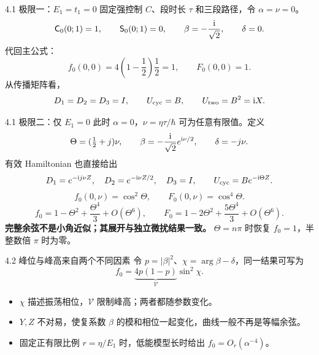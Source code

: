 \documentclass[aspectratio=169,11pt]{beamer}
\begin{document}
\begin{frame}[t]{4.1 极限一：$E_1=t_1=0$}
  固定强控制 $C$、段时长 $\tau$ 和三段路径，令 $\alpha=\nu=0$。
  \[
    \mathsf C_0(0;1)=1,\qquad\mathsf S_0(0;1)=0,\qquad
    \beta=-\frac{\mathrm{i}}{\sqrt2},\qquad\delta=0.
  \]
  代回主公式：
  \[
    \boxed{f_0(0,0)=4\left(1-\frac12\right)\frac12=1,\qquad F_0(0,0)=1.}
  \]
  从传播矩阵看，
  \[
    D_1=D_2=D_3=I,\qquad U_{\rm cyc}=B,\qquad U_{\rm two}=B^2=\mathrm{i} X.
  \]
  \vspace{.25cm}
\end{frame}

\begin{frame}[t]{4.1 极限二：仅 $E_1=0$}
  \small
  此时 $\alpha=0$，$\nu=\eta\tau/\hbar$ 可为任意有限值。定义
  \[
    \Theta=(\tfrac12+j)\nu,\qquad
    \beta=-\frac{\mathrm{i}}{\sqrt2}e^{\mathrm{i}\nu/2},\qquad\delta=-j\nu.
  \]
  有效 Hamiltonian 也直接给出
  \[
    D_1=e^{-\mathrm{i} j\nu Z},\quad D_2=e^{-\mathrm{i}\nu Z/2},\quad D_3=I,
    \qquad U_{\rm cyc}=Be^{-\mathrm{i}\Theta Z}.
  \]
  \[
    \boxed{f_0(0,\nu)=\cos^2\Theta,\qquad F_0(0,\nu)=\cos^4\Theta.}
  \]
  \[
    f_0=1-\Theta^2+\frac{\Theta^4}{3}+O(\Theta^6),\qquad
    F_0=1-2\Theta^2+\frac{5\Theta^4}{3}+O(\Theta^6).
  \]
  \textbf{完整余弦不是小角近似；其展开与独立微扰结果一致。}
  $\Theta=n\pi$ 时恢复 $f_0=1$，半整数倍 $\pi$ 时为零。
\end{frame}

\begin{frame}[t]{4.2 峰位与峰高来自两个不同因素}
  令 $p=|\beta|^2$、$\chi=\arg\beta-\delta$，同一结果可写为
  \[
    \boxed{f_0=\underbrace{4p(1-p)}_{\mathcal V}\sin^2\chi.}
  \]
  \begin{itemize}\setlength{\itemsep}{.2cm}
    \item $\chi$ 描述振荡相位，$\mathcal V$ 限制峰高；两者都随参数变化。
    \item $Y,Z$ 不对易，使复系数 $\beta$ 的模和相位一起变化，曲线一般不再是等幅余弦。
    \item 固定正有限比例 $r=\eta/E_1$ 时，低能模型长时给出 $f_0=O_r(\alpha^{-4})$。
  \end{itemize}
  \vspace{.15cm}
\end{frame}
\end{document}
